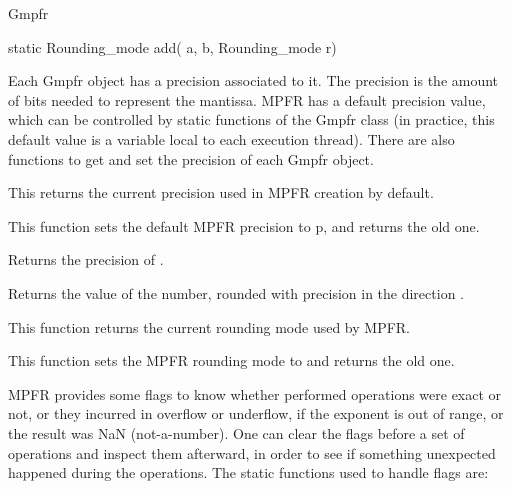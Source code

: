 \begin{ccRefClass} {Gmpfr}
\ccOperations

\ccSetThreeColumns
        {static Rounding\_mode}
        {add( a, b, Rounding\_mode r)}
        {}


Each Gmpfr object has a precision associated to it. The precision is the
amount of bits needed to represent the mantissa. MPFR has a default
precision value, which can be controlled by static functions of the Gmpfr
class (in practice, this default value is a variable local to each
execution thread). There are also functions to get and set the precision of
each Gmpfr object.

        {This returns the current precision used in MPFR creation
        by default.}

        {This function sets the default MPFR precision to p, and returns
        the old one.}

        {Returns the precision of \ccVar.}

        {Returns the value of the number, rounded with precision 
        in the direction .}


        {This function returns the current rounding mode used by MPFR.}

        {This function sets the MPFR rounding mode to  and returns
        the old one.}



MPFR provides some flags to know whether performed operations were exact
or not, or they incurred in overflow or underflow, if the exponent is
out of range, or the result was NaN (not-a-number). One can clear the
flags before a set of operations and inspect them afterward, in order to
see if something unexpected happened during the operations. The static
functions used to handle flags are:


\end{ccRefClass}
